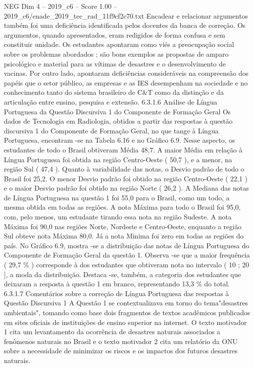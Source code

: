 \begin{textsample}{NEG Dim 4 – 2019\_c6 – Score 1.00 – 2019\_c6/enade\_2019\_tec\_rad\_11f9cf2c70.txt}
Encadear e relacionar argumentos também foi uma deficiência identificada pelos docentes da banca de correção.
Os argumentos, quando apresentados, eram redigidos de forma confusa e sem constituir unidade.
Os estudantes apontaram como viés a preocupação social sobre os problemas abordados ; são bons exemplos as propostas de amparo psicológico e material para as vítimas de desastres e o desenvolvimento de vacinas.
Por outro lado, apontaram deficiências consideráveis na compreensão dos papéis que o setor público, as empresas e as IES desempenham na sociedade e no conhecimento tanto do sistema brasileiro de C\&T como da distinção e da articulação entre ensino, pesquisa e extensão. 6.3.1.6 Análise de Língua Portuguesa da Questão Discursiva 1 do Componente de Formação Geral Os dados de Tecnologia em Radiologia, obtidos a partir das respostas à questão discursiva 1 do Componente de Formação Geral, no que tange à Língua Portuguesa, encontram -se na Tabela 6.16 e no Gráfico 6.9.
Nesse aspecto, os estudantes de todo o Brasil obtiveram Média 48,7.
A maior Média em relação à Língua Portuguesa foi obtida na região Centro-Oeste ( 50,7 ), e a menor, na região Sul ( 47,4 ).
Quanto à variabilidade das notas, o Desvio padrão de todo o Brasil foi 25,2.
O menor Desvio padrão foi obtido na região Centro-Oeste ( 22,1 ) e o maior Desvio padrão foi obtido na região Norte ( 26,2 ).
A Mediana das notas de Língua Portuguesa na questão 1 foi 55,0 para o Brasil, como um todo, a mesma obtida em todas as regiões.
A nota Máxima para todo o Brasil foi 95,0, com, pelo menos, um estudante tirando essa nota na região Sudeste.
A nota Máxima foi 90,0 nas regiões Norte, Nordeste e Centro-Oeste, enquanto a região Sul obteve nota Máxima 80,0.
Já a nota Mínima foi zero em todas as regiões do país.
No Gráfico 6.9, mostra -se a distribuição das notas de Língua Portuguesa do Componente de Formação Geral da questão 1.
Observa -se que a maior frequência ( 29,7 \% ) corresponde à dos estudantes que obtiveram nota no intervalo ( 10 ; 20 ], a moda da distribuição.
Destaca -se, também, a categoria dos estudantes que deixaram a resposta à questão 1 em branco, representando 13,3 \% do total. 6.3.1.7 Comentários sobre a correção de Língua Portuguesa das respostas à Questão Discursiva 1 A Questão 1 se contextualizava em torno do tema"desastres ambientais", tomando como base dois fragmentos de textos acadêmicos publicados em sites oficiais de instituições de ensino superior na internet.
O texto motivador 1 cita um levantamento da ocorrência de desastres naturais associados a fenômenos naturais no Brasil e o texto motivador 2 cita um relatório da ONU sobre a necessidade de minimizar os riscos e os impactos dos futuros desastres naturais.

\end{textsample}
